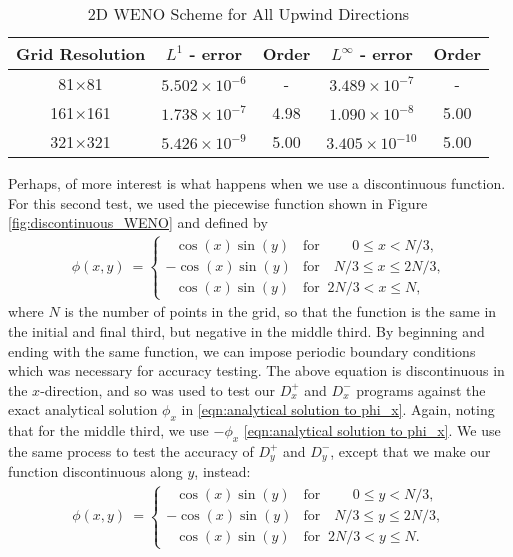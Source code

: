 \documentclass[oneside,12pt,final]{/Applications/TeX/packages/ucthesis-CA2012}
\begin{document}
\begin{mainmatter}
\begin{table} [!h]
\caption{2D WENO Scheme for All Upwind Directions}
\label{table:WENO_continuous}
\centering
\begin{tabular}{c c c c c}
\hline
Grid Resolution  & $L^1$ - error    & Order  & $L^\infty$ - error & Order \\ \hline
81$\times$81          & $5.502 \times 10^{-6} $ &   -    & $3.489 \times 10^{-7}$   &  -  \\
161$\times$161        & $1.738 \times 10^{-7}$  &  4.98  & $1.090 \times 10^{-8} $  & 5.00\\
321$\times$321        & $5.426 \times 10^{-9}$  &  5.00  & $3.405 \times 10^{-10} $ & 5.00\\
\end{tabular}
\end{table}


Perhaps, of more interest is what happens when we use a discontinuous function. For this second test, we used the piecewise function shown in Figure \ref{fig:discontinuous_WENO} and defined by
\begin{equation}
\begin{aligned}
    \phi(x,y) \>  = 
\begin{cases}
    \>\>\>\cos(x)\sin(y) & \text{for   }\>\>\>\>\>\>\>\>\> 0 \le x < N/3, \\ 
    -\cos(x)\sin(y) & \text{for   }\>\>\>N/3 \le x \le 2N/3, \\
    \>\>\>\cos(x)\sin(y) & \text{for   }\>2N/3 < x \le N,
\end{cases}
\end{aligned}
\end{equation}
where $N$ is the number of points in the grid, so that the function is the same in the initial and final third, but negative in the middle third. By beginning and ending with the same function, we can impose periodic boundary conditions which was necessary for accuracy testing. The above equation is discontinuous in the $x$-direction, and so was used to test our $D_x^+$ and $D_x^-$ programs against the exact analytical solution $\phi_x$ in \eqref{eqn:analytical solution to phi_x}. Again, noting that for the middle third, we use $- \phi_x$ \eqref{eqn:analytical solution to phi_x}. We use the same process to test the accuracy of $D_y^+$ and $D_y^-$, except that we make our function discontinuous along $y$, instead:
\begin{equation}
\begin{aligned}
    \phi(x,y) \>  = 
\begin{cases}
    \>\>\>\cos(x)\sin(y) & \text{for   }\>\>\>\>\>\>\>\>\> 0 \le y < N/3, \\ 
    -\cos(x)\sin(y) & \text{for   }\>\>\>N/3 \le y \le 2N/3, \\
    \>\>\>\cos(x)\sin(y) & \text{for   }\>2N/3 < y \le N.
\end{cases}
\end{aligned}
\end{equation}


\end{mainmatter}
\end{document}

